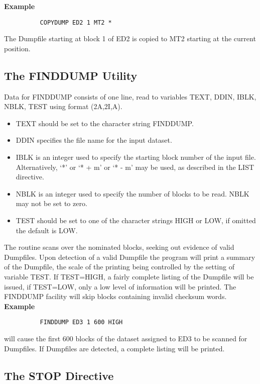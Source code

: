 \documentclass[11pt,fleqn]{article}
\begin{document}
{\bf Example}
{
\footnotesize
\begin{verbatim}
          COPYDUMP ED2 1 MT2 *
\end{verbatim}
}
The Dumpfile starting at block 1 of ED2 is copied to MT2 starting at
the current position.


\subsection{The FINDDUMP Utility}

Data for  FINDDUMP  consists of one line, read to variables
TEXT, DDIN, IBLK, NBLK, TEST using format (2A,2I,A).
\begin{itemize}
\item TEXT should be set to the character string FINDDUMP.
\item DDIN specifies the file name for the input dataset.
\item IBLK is an integer used to specify the starting block number of
the input file. Alternatively, `*' or `* + m' or `* - m'
may be used, as described in the LIST directive.
\item NBLK is an integer used to specify the number of blocks to be
read. NBLK may not be set to zero.
\item TEST should be set to one of the character strings HIGH or LOW,
if omitted the default is LOW.
\end{itemize}
The routine scans over the nominated blocks, seeking out evidence of
valid Dumpfiles. Upon detection of a valid Dumpfile
the program will
print a summary of the Dumpfile, the scale of the printing being
controlled by the setting of variable TEST. If TEST=HIGH, a fairly
complete listing of the Dumpfile will be issued, if TEST=LOW, only a
low level of information will be printed. The FINDDUMP facility will
skip blocks containing invalid checksum words.\\

{\bf Example}
{
\footnotesize
\begin{verbatim}
          FINDDUMP ED3 1 600 HIGH
\end{verbatim}
}
will cause the first 600 blocks of the dataset assigned to ED3 to be
scanned for Dumpfiles. If Dumpfiles are detected, a complete listing
will be printed.

\subsection{The STOP Directive}
\end{document}
